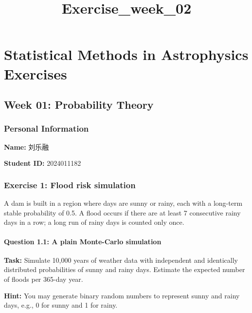 \documentclass[11pt]{article}
\title{Exercise\_week\_02}
\begin{document}
    
    \maketitle
    
    

    
    \section{Statistical Methods in Astrophysics
Exercises}\label{statistical-methods-in-astrophysics-exercises}

\subsection{Week 01: Probability
Theory}\label{week-01-probability-theory}

\subsubsection{Personal Information}\label{personal-information}

\textbf{Name:} 刘乐融

\textbf{Student ID:} 2024011182

    \subsubsection{Exercise 1: Flood risk
simulation}\label{exercise-1-flood-risk-simulation}

A dam is built in a region where days are sunny or rainy, each with a
long-term stable probability of 0.5. A flood occurs if there are at
least 7 consecutive rainy days in a row; a long run of rainy days is
counted only once.

\paragraph{Question 1.1: A plain Monte-Carlo
simulation}\label{question-1.1-a-plain-monte-carlo-simulation}

\textbf{Task:} Simulate 10,000 years of weather data with independent
and identically distributed probabilities of sunny and rainy days.
Estimate the expected number of floods per 365-day year.

\textbf{Hint:} You may generate binary random numbers to represent sunny
and rainy days, e.g., 0 for sunny and 1 for rainy.
\end{document}
